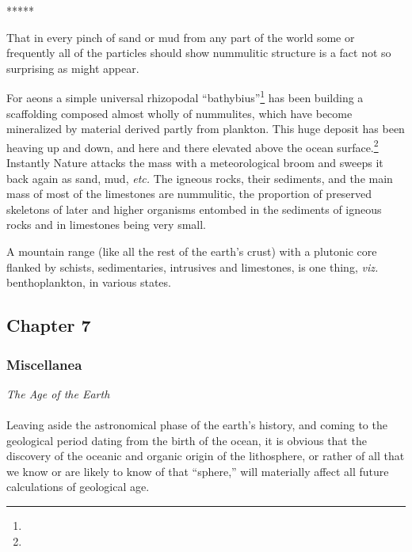 \documentclass[a4paper, 12pt, oneside]{article}
\begin{document}
\centerline{*\hspace{15mm}*\hspace{15mm}*\hspace{15mm}*\hspace{15mm}*}
\bigskip

That in every pinch of sand or mud from any part of the world some or frequently all of the particles should show nummulitic structure is a fact not so surprising as might appear.

For aeons a simple universal rhizopodal ``bathybius''\footnote{} has been building a scaffolding composed almost wholly of nummulites, which have become mineralized by material derived partly from plankton. This huge deposit has been heaving up and down, and here and there elevated above the ocean surface.\footnote{} Instantly Nature attacks the mass with a meteorological broom and sweeps it back again as sand, mud, \emph{etc.} The igneous rocks, their sediments, and the main mass of most of the limestones are nummulitic, the proportion of preserved skeletons of later and higher organisms entombed in the sediments of igneous rocks and in limestones being very small.

A mountain range (like all the rest of the earth's crust) with a plutonic core flanked by schists, sedimentaries, intrusives and limestones, is one thing, \emph{viz.} benthoplankton, in various states.
\clearpage
\subsection{Chapter 7}
\subsubsection{Miscellanea}
\centerline{\emph{The Age of the Earth}}
\paragraph{}
Leaving aside the astronomical phase of the earth's history, and coming to the geological period dating from the birth of the ocean, it is obvious that the discovery of the oceanic and organic origin of the lithosphere, or rather of all that we know or are likely to know of that ``sphere,'' will materially affect all future calculations of geological age.
\end{document}
